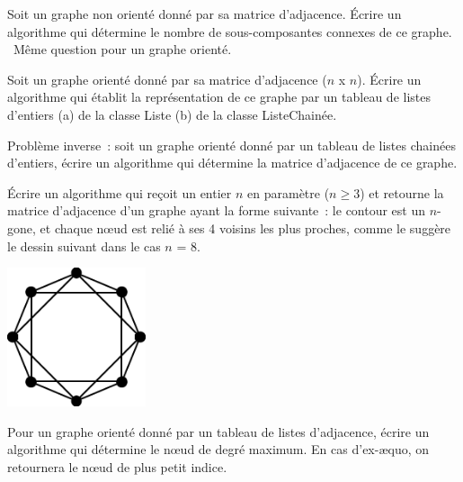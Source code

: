 	\begin{Exercice}{}
		Soit un graphe non orienté donné par sa matrice d'adjacence. 
		Écrire un algorithme qui détermine le nombre de
		sous-composantes connexes de ce graphe. \
		Même question pour un graphe orienté.

	\end{Exercice}
	
	\begin{Exercice}{}
		Soit un graphe orienté donné par sa matrice d'adjacence 
		($n$ \textsf{x} $n$). Écrire un algorithme qui établit la représentation 
		de ce graphe par un tableau de listes d'entiers (a) de la classe Liste 
		(b) de la classe ListeChainée.

	\end{Exercice}
	
	\begin{Exercice}{}
		Problème inverse~: soit un graphe orienté donné par un tableau 
		de listes chainées d'entiers, écrire un algorithme qui
		détermine la matrice d'adjacence de ce graphe.

	\end{Exercice}
	
	\begin{Exercice}{}
		Écrire un algorithme qui reçoit un entier $n$ 
		en paramètre ($n \geq 3$) et retourne la matrice
		d'adjacence d'un graphe ayant la forme suivante~: 
		le contour est un $n$-gone, et chaque n{\oe}ud est relié à
		ses 4 voisins les plus proches, comme le suggère 
		le dessin suivant dans le cas $n$ = 8.
		\begin{center}
		\includegraphics[width=4.073cm,height=4.073cm]{image/a2012Logique2eme-img057.png}
		\end{center}

	\end{Exercice}
	
	\begin{Exercice}{}
		Pour un graphe orienté donné par un tableau de listes d'adjacence, 
		écrire un algorithme qui détermine le n{\oe}ud de
		degré maximum. En cas d'ex-æquo, on retournera le n{\oe}ud 
		de plus petit indice.

	\end{Exercice}
	
